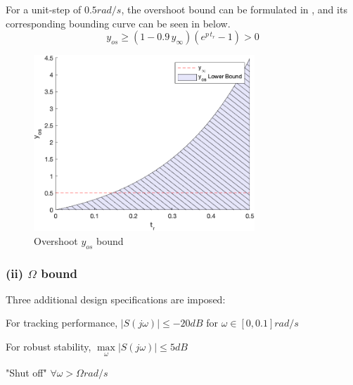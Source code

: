 \documentclass{tron}
\begin{document}
For a unit-step of $0.5 \unit{rad/s}$, the overshoot bound can be formulated in , and its corresponding bounding curve can be seen in  below.
\begin{equation}
	y_{os} \geq (1-0.9\, y_{\infty})(e^{p\, t_r} - 1) > 0 \label{eqn:p4:yos:bound}
\end{equation}
\begin{figure}[H]
	\centering
	\includegraphics[height=250px]{../matlab/output/p4/y_os-bound}
	\caption{Overshoot $y_{os}$ bound}
	\label{fig:yos}
\end{figure}


\newpage
\subsubsection{(ii) $\Omega$ bound \label{sec:4aii}}
Three additional design specifications are imposed:
\begin{spec-list}
	\item For tracking performance, $|S(j\omega)| \leq -20 \unit{dB}$ for $\omega \in [0, 0.1] \unit{rad/s}$ \label{spec:track}
	\item For robust stability, $\underset{\omega}{\max}|S(j\omega)| \leq 5 \unit{dB}$ \label{spec:max}
	\item "Shut off" $\forall \omega > \Omega \unit{rad/s}$ \label{spec:shut}
\end{spec-list}
\end{document}
